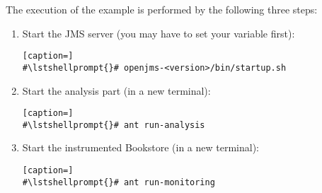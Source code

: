  The execution of the example is performed by the following three steps:
\begin{enumerate}
\item Start the JMS server (you may have to set your  variable first):

\setBashListing
\begin{lstlisting}[caption=]
#\lstshellprompt{}# openjms-<version>/bin/startup.sh
\end{lstlisting}
\item Start the analysis part (in a new terminal):
\setBashListing
\begin{lstlisting}[caption=]
#\lstshellprompt{}# ant run-analysis
\end{lstlisting}
\item Start the instrumented Bookstore (in a new terminal):
\setBashListing
\begin{lstlisting}[caption=]
#\lstshellprompt{}# ant run-monitoring
\end{lstlisting}
\end{enumerate}
